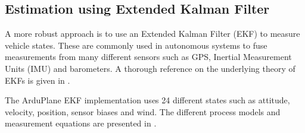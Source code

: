 \subsection{Estimation using Extended Kalman Filter}\label{sec:wind_ekf}
A more robust approach is to use an Extended Kalman Filter (EKF) to measure vehicle states. These are 
commonly used in autonomous systems to fuse measurements from many different sensors such as GPS, Inertial Measurement Units (IMU) and barometers. 
A thorough reference on the underlying theory of EKFs is given in \cite{sensor_fusion}.

The ArduPlane EKF implementation uses 24 different states such as attitude, velocity, position, sensor biases and wind. The different process models and 
measurement equations are presented in \cite{px4_ecl_ekf}.